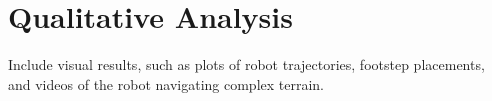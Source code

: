 \section{Qualitative Analysis}

\begin{outline}
  Include visual results, such as plots of robot trajectories, footstep placements, and videos of the robot navigating complex terrain.
\end{outline}
